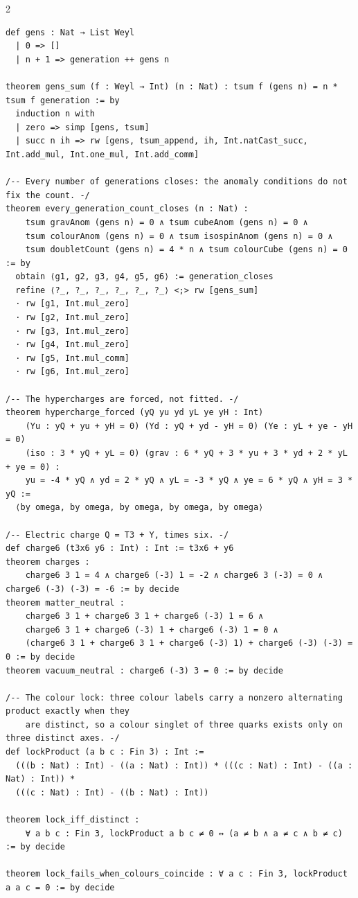 \documentclass[10pt]{article}
\begin{document}
\begin{multicols}{2}
\begin{Verbatim}[fontsize=\fontsize{6.2}{7.2}\selectfont,breaklines,breakanywhere,breaksymbolleft={}]
def gens : Nat → List Weyl
  | 0 => []
  | n + 1 => generation ++ gens n

theorem gens_sum (f : Weyl → Int) (n : Nat) : tsum f (gens n) = n * tsum f generation := by
  induction n with
  | zero => simp [gens, tsum]
  | succ n ih => rw [gens, tsum_append, ih, Int.natCast_succ, Int.add_mul, Int.one_mul, Int.add_comm]

/-- Every number of generations closes: the anomaly conditions do not fix the count. -/
theorem every_generation_count_closes (n : Nat) :
    tsum gravAnom (gens n) = 0 ∧ tsum cubeAnom (gens n) = 0 ∧
    tsum colourAnom (gens n) = 0 ∧ tsum isospinAnom (gens n) = 0 ∧
    tsum doubletCount (gens n) = 4 * n ∧ tsum colourCube (gens n) = 0 := by
  obtain ⟨g1, g2, g3, g4, g5, g6⟩ := generation_closes
  refine ⟨?_, ?_, ?_, ?_, ?_, ?_⟩ <;> rw [gens_sum]
  · rw [g1, Int.mul_zero]
  · rw [g2, Int.mul_zero]
  · rw [g3, Int.mul_zero]
  · rw [g4, Int.mul_zero]
  · rw [g5, Int.mul_comm]
  · rw [g6, Int.mul_zero]

/-- The hypercharges are forced, not fitted. -/
theorem hypercharge_forced (yQ yu yd yL ye yH : Int)
    (Yu : yQ + yu + yH = 0) (Yd : yQ + yd - yH = 0) (Ye : yL + ye - yH = 0)
    (iso : 3 * yQ + yL = 0) (grav : 6 * yQ + 3 * yu + 3 * yd + 2 * yL + ye = 0) :
    yu = -4 * yQ ∧ yd = 2 * yQ ∧ yL = -3 * yQ ∧ ye = 6 * yQ ∧ yH = 3 * yQ :=
  ⟨by omega, by omega, by omega, by omega, by omega⟩

/-- Electric charge Q = T3 + Y, times six. -/
def charge6 (t3x6 y6 : Int) : Int := t3x6 + y6
theorem charges :
    charge6 3 1 = 4 ∧ charge6 (-3) 1 = -2 ∧ charge6 3 (-3) = 0 ∧ charge6 (-3) (-3) = -6 := by decide
theorem matter_neutral :
    charge6 3 1 + charge6 3 1 + charge6 (-3) 1 = 6 ∧
    charge6 3 1 + charge6 (-3) 1 + charge6 (-3) 1 = 0 ∧
    (charge6 3 1 + charge6 3 1 + charge6 (-3) 1) + charge6 (-3) (-3) = 0 := by decide
theorem vacuum_neutral : charge6 (-3) 3 = 0 := by decide

/-- The colour lock: three colour labels carry a nonzero alternating product exactly when they
    are distinct, so a colour singlet of three quarks exists only on three distinct axes. -/
def lockProduct (a b c : Fin 3) : Int :=
  (((b : Nat) : Int) - ((a : Nat) : Int)) * (((c : Nat) : Int) - ((a : Nat) : Int)) *
  (((c : Nat) : Int) - ((b : Nat) : Int))

theorem lock_iff_distinct :
    ∀ a b c : Fin 3, lockProduct a b c ≠ 0 ↔ (a ≠ b ∧ a ≠ c ∧ b ≠ c) := by decide

theorem lock_fails_when_colours_coincide : ∀ a c : Fin 3, lockProduct a a c = 0 := by decide


\end{Verbatim}
\end{multicols}
\end{document}
